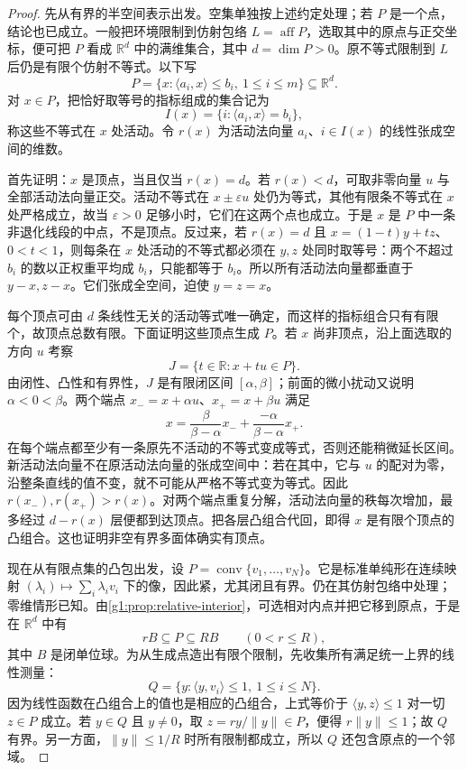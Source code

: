 \begin{proof}
	先从有界的半空间表示出发。空集单独按上述约定处理；若 \(P\) 是一个点，结论也已成立。一般把环境限制到仿射包络 \(L=\operatorname{aff}P\)，选取其中的原点与正交坐标，便可把 \(P\) 看成 \(\mathbb R^d\) 中的满维集合，其中 \(d=\dim P>0\)。原不等式限制到 \(L\) 后仍是有限个仿射不等式。以下写
	\[
		P=\{x:\langle a_i,x\rangle\le b_i,\ 1\le i\le m\}\subseteq\mathbb R^d.
	\]
	对 \(x\in P\)，把恰好取等号的指标组成的集合记为
	\[
		I(x)=\{i:\langle a_i,x\rangle=b_i\},
	\]
	称这些不等式在 \(x\) 处活动。令 \(r(x)\) 为活动法向量 \(a_i\)、\(i\in I(x)\) 的线性张成空间的维数。

	首先证明：\(x\) 是顶点，当且仅当 \(r(x)=d\)。若 \(r(x)<d\)，可取非零向量 \(u\) 与全部活动法向量正交。活动不等式在 \(x\pm\varepsilon u\) 处仍为等式，其他有限条不等式在 \(x\) 处严格成立，故当 \(\varepsilon>0\) 足够小时，它们在这两个点也成立。于是 \(x\) 是 \(P\) 中一条非退化线段的中点，不是顶点。反过来，若 \(r(x)=d\) 且 \(x=(1-t)y+tz\)、\(0<t<1\)，则每条在 \(x\) 处活动的不等式都必须在 \(y,z\) 处同时取等号：两个不超过 \(b_i\) 的数以正权重平均成 \(b_i\)，只能都等于 \(b_i\)。所以所有活动法向量都垂直于 \(y-x,z-x\)。它们张成全空间，迫使 \(y=z=x\)。

	每个顶点可由 \(d\) 条线性无关的活动等式唯一确定，而这样的指标组合只有有限个，故顶点总数有限。下面证明这些顶点生成 \(P\)。若 \(x\) 尚非顶点，沿上面选取的方向 \(u\) 考察
	\[
		J=\{t\in\mathbb R:x+tu\in P\}.
	\]
	由闭性、凸性和有界性，\(J\) 是有限闭区间 \([\alpha,\beta]\)；前面的微小扰动又说明 \(\alpha<0<\beta\)。两个端点 \(x_-=x+\alpha u\)、\(x_+=x+\beta u\) 满足
	\[
		x=\frac{\beta}{\beta-\alpha}x_-+\frac{-\alpha}{\beta-\alpha}x_+.
	\]
	在每个端点都至少有一条原先不活动的不等式变成等式，否则还能稍微延长区间。新活动法向量不在原活动法向量的张成空间中：若在其中，它与 \(u\) 的配对为零，沿整条直线的值不变，就不可能从严格不等式变为等式。因此 \(r(x_-),r(x_+)>r(x)\)。对两个端点重复分解，活动法向量的秩每次增加，最多经过 \(d-r(x)\) 层便都到达顶点。把各层凸组合代回，即得 \(x\) 是有限个顶点的凸组合。这也证明非空有界多面体确实有顶点。

	现在从有限点集的凸包出发，设 \(P=\operatorname{conv}\{v_1,\ldots,v_N\}\)。它是标准单纯形在连续映射 \((\lambda_i)\mapsto\sum_i\lambda_iv_i\) 下的像，因此紧，尤其闭且有界。仍在其仿射包络中处理；零维情形已知。由\cref{g1:prop:relative-interior}，可选相对内点并把它移到原点，于是在 \(\mathbb R^d\) 中有
	\[
		rB\subseteq P\subseteq RB\qquad(0<r\le R),
	\]
	其中 \(B\) 是闭单位球。为从生成点造出有限个限制，先收集所有满足统一上界的线性测量：
	\[
		Q=\{y:\langle y,v_i\rangle\le1,\ 1\le i\le N\}.
	\]
	因为线性函数在凸组合上的值也是相应的凸组合，上式等价于 \(\langle y,z\rangle\le1\) 对一切 \(z\in P\) 成立。若 \(y\in Q\) 且 \(y\ne0\)，取 \(z=ry/\lVert y\rVert\in P\)，便得 \(r\lVert y\rVert\le1\)；故 \(Q\) 有界。另一方面，\(\lVert y\rVert\le1/R\) 时所有限制都成立，所以 \(Q\) 还包含原点的一个邻域。


\end{proof}
